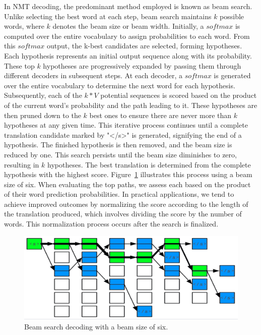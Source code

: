 In NMT decoding, the predominant method employed is known as beam search. 
Unlike selecting the best word at each step, beam search maintains $k$ possible words, where $k$ denotes the beam size or beam width. 
Initially, a $softmax$ is computed over the entire vocabulary to assign probabilities to each word. 
From this $softmax$ output, the k-best candidates are selected, forming hypotheses. 
Each hypothesis represents an initial output sequence along with its probability. 
These top $k$ hypotheses are progressively expanded by passing them through different decoders in subsequent steps. 
At each decoder, a $softmax$ is generated over the entire vocabulary to determine the next word for each hypothesis. 
Subsequently, each of the $k * V$ potential sequences is scored based on the product of the current word's probability and the path leading to it. 
These hypotheses are then pruned down to the $k$ best ones to ensure there are never more than $k$ hypotheses at any given time. 
This iterative process continues until a complete translation candidate marked by "</s>" is generated, signifying the end of a hypothesis. 
The finished hypothesis is then removed, and the beam size is reduced by one. 
This search persists until the beam size diminishes to zero, resulting in $k$ hypotheses. 
The best translation is determined from the complete hypothesis with the highest score. 
Figure~\ref{fig:beam} illustrates this process using a beam size of six.
When evaluating the top paths, we assess each based on the product of their word prediction probabilities. 
In practical applications, we tend to achieve improved outcomes by normalizing the score according to the length of the translation produced, which involves dividing the score by the number of words. 
This normalization process occurs after the search is finalized.
\begin{figure}
	\centering
	\includegraphics[width=0.7\linewidth]{Figures/beam}
	\caption{Beam search decoding with a beam size of six.}
	\label{fig:beam}
\end{figure}

